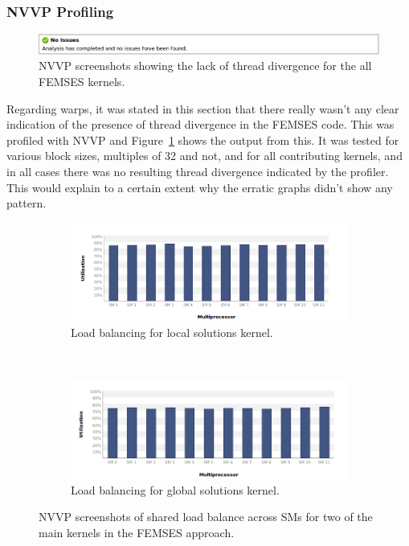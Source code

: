 \subsubsection{NVVP Profiling}

\begin{figure}
	\centering
	\includegraphics[width = 0.7\linewidth]{Figures/femses_divergence}
	\caption{NVVP screenshots showing the lack of thread divergence for the all FEMSES kernels.}
	\label{fig:femses_diverge_prof}
\end{figure}

Regarding warps, it was stated in this section that there really wasn't any clear indication of the presence of thread divergence in the FEMSES code. This was profiled with NVVP and Figure~\ref{fig:femses_diverge_prof} shows the output from this. It was tested for various block sizes, multiples of 32 and not, and for all contributing kernels, and in all cases there was no resulting thread divergence indicated by the profiler. This would explain to a certain extent why the erratic graphs didn't show any pattern.

\begin{figure}
	\centering
	\begin{subfigure}{0.7\linewidth}
		\centering
		\includegraphics[width = \linewidth]{Figures/femses_jacobi_load}
		\caption{Load balancing for local solutions kernel.}
	\end{subfigure}\\
	\begin{subfigure}{0.7\linewidth}
		\centering
		\includegraphics[width=\linewidth]{Figures/femses_glob_load}
		\caption{Load balancing for global solutions kernel.}
	\end{subfigure}
	\caption{NVVP screenshots of shared load balance across SMs for two of the main kernels in the FEMSES approach.}
	\label{fig:femses_load}
\end{figure}


